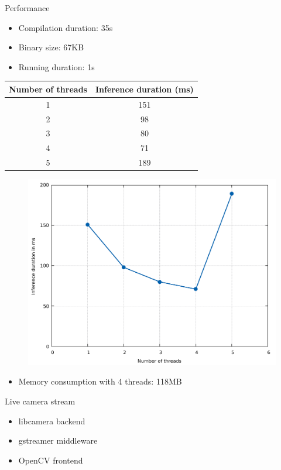 \begin{frame}{Performance}
  \begin{itemize}
	\item Compilation duration: 35s
	\item Binary size: 67KB
	\item Running duration: 1s
  \end{itemize}
  \begin{table}
    {\tiny
	\begin{tabular}{|c|c|}
	  \hline
		\textbf{Number of threads} & \textbf{Inference duration (ms)} \\
	  \hline
		1 & 151 \\
	  \hline
		2 & 98 \\
	  \hline
		3 & 80 \\
	  \hline
		4 & 71 \\
	  \hline
		5 & 189 \\
	  \hline
	\end{tabular}
	}
  \end{table}
  \begin{figure}
	\includegraphics[width=\linewidth,height=0.45\textheight,keepaspectratio]{images/inference_duration_rps.pdf}
  \end{figure}
  \begin{itemize}
	\item Memory consumption with 4 threads: 118MB
  \end{itemize}
\end{frame}

\begin{frame}{Live camera stream}
  \begin{itemize}
	\item libcamera backend
	\item gstreamer middleware
	\item OpenCV frontend
  \end{itemize}
\end{frame}


